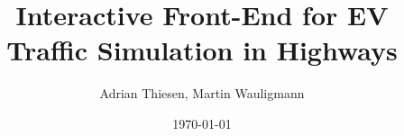 


\graphicspath{ {graphics/} }

\usepackage[outputdir=build/output]{minted}

\usepackage{etoolbox}




\usepackage[T1]{fontenc}
\usepackage[scaled=0.9]{beramono}

\usepackage{fixltx2e}

\usepackage{url}
\usepackage{hyperref}

\setlength{\footnotesep}{0.8\baselineskip}

\usepackage{dirtree}



\newcommand{\Thema}{Interactive Front-End for EV Traffic Simulation in Highways}
\newcommand{\Author}{Adrian Thiesen, Martin Wauligmann}
\newcommand{\Date}{\today}

\title{\Thema}
\author{\Author}
\date{\today}



\tableofcontents




\cleardoublepage
{}
\listoffigures

\renewcommand\bibname{References}

\cleardoublepage
{}



